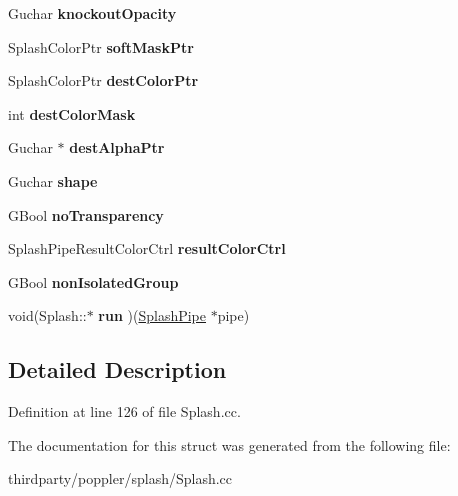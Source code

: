 \begin{DoxyCompactItemize}
Guchar {\bfseries knockout\+Opacity}
\item 
\mbox{\label{struct_splash_pipe_a965e55641fbe1bd2e501212a9e066ab5}} 
Splash\+Color\+Ptr {\bfseries soft\+Mask\+Ptr}
\item 
\mbox{\label{struct_splash_pipe_a5939d9e6bfa38024cb1449ef28bb6e38}} 
Splash\+Color\+Ptr {\bfseries dest\+Color\+Ptr}
\item 
\mbox{\label{struct_splash_pipe_a1428d340cf2a8f46b3be35d9776f14e7}} 
int {\bfseries dest\+Color\+Mask}
\item 
\mbox{\label{struct_splash_pipe_adb64db7581319184f724db7542b0bcd4}} 
Guchar $\ast$ {\bfseries dest\+Alpha\+Ptr}
\item 
\mbox{\label{struct_splash_pipe_a7441ef8080cf911eac719119095da5fd}} 
Guchar {\bfseries shape}
\item 
\mbox{\label{struct_splash_pipe_a7c61ffe3d34ff3116015b023f1f2e94c}} 
G\+Bool {\bfseries no\+Transparency}
\item 
\mbox{\label{struct_splash_pipe_a2ee09f94ae3b181908adebd6f6bfaf35}} 
Splash\+Pipe\+Result\+Color\+Ctrl {\bfseries result\+Color\+Ctrl}
\item 
\mbox{\label{struct_splash_pipe_afdb11b888953795de0306693790a6100}} 
G\+Bool {\bfseries non\+Isolated\+Group}
\item 
\mbox{\label{struct_splash_pipe_a177eb0091774bc4497053310e9fefb0e}} 
void(Splash\+::$\ast$ {\bfseries run} )(\hyperlink{struct_splash_pipe}{Splash\+Pipe} $\ast$pipe)
\end{DoxyCompactItemize}


\subsection{Detailed Description}


Definition at line 126 of file Splash.\+cc.



The documentation for this struct was generated from the following file\+:\begin{DoxyCompactItemize}
\item 
thirdparty/poppler/splash/Splash.\+cc\end{DoxyCompactItemize}
